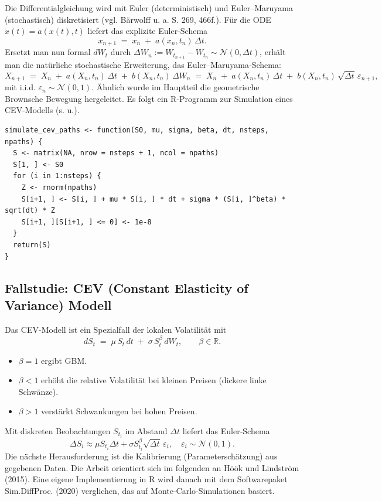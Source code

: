 Die Differentialgleichung wird mit Euler (deterministisch) und Euler–Maruyama (stochastisch) diskretisiert (vgl. Bärwolff \cite{Baerwolff2025} u. a. S. 269, 466f.).
Für die ODE $\dot x(t)=a(x(t),t)$ liefert das explizite Euler‑Schema
$$
x_{n+1} \;=\; x_n \;+\; a(x_n,t_n)\,\Delta t.
$$
Ersetzt man nun formal $dW_t$ durch $\Delta W_n:=W_{t_{n+1}}-W_{t_n}\sim \mathcal N(0,\Delta t)$, erhält man die natürliche stochastische Erweiterung, das Euler–Maruyama‑Schema:
$$
X_{n+1} \;=\; X_n \;+\; a(X_n,t_n)\,\Delta t \;+\; b(X_n,t_n)\,\Delta W_n
\;=\; X_n \;+\; a(X_n,t_n)\,\Delta t \;+\; b(X_n,t_n)\,\sqrt{\Delta t}\,\varepsilon_{n+1},
$$
mit i.i.d. $\varepsilon_{n}\sim\mathcal N(0,1)$. 
Ähnlich wurde im Hauptteil die geometrische Brownsche Bewegung hergeleitet.
Es folgt ein R-Programm zur Simulation eines CEV-Modells (s. u.).

\begin{lstlisting}
simulate_cev_paths <- function(S0, mu, sigma, beta, dt, nsteps, npaths) {
  S <- matrix(NA, nrow = nsteps + 1, ncol = npaths)
  S[1, ] <- S0
  for (i in 1:nsteps) {
    Z <- rnorm(npaths)
    S[i+1, ] <- S[i, ] + mu * S[i, ] * dt + sigma * (S[i, ]^beta) * sqrt(dt) * Z
    S[i+1, ][S[i+1, ] <= 0] <- 1e-8
  }
  return(S)
}
\end{lstlisting}

\subsection{Fallstudie: CEV (Constant Elasticity of Variance) Modell}
Das CEV-Modell ist ein Spezialfall der lokalen Volatilität mit
$$
dS_t \;=\; \mu\,S_t\,dt \;+\; \sigma\,S_t^{\beta}\,dW_t,\qquad \beta\in\mathbb R.
$$
\begin{itemize}
\item $\beta=1$ ergibt GBM. 
\item $\beta<1$ erhöht die relative Volatilität bei kleinen Preisen (dickere linke Schwänze).
\item $\beta>1$ verstärkt Schwankungen bei hohen Preisen.
\end{itemize}

Mit diskreten Beobachtungen $S_{t_i}$ im Abstand $\Delta t$ liefert das Euler‑Schema
$$
\Delta S_i \approx \mu S_{t_i}\Delta t + \sigma S_{t_i}^{\beta}\sqrt{\Delta t}\,\varepsilon_i,\quad \varepsilon_i\sim\mathcal N(0,1).
$$
Die nächste Herausforderung ist die Kalibrierung (Parameterschätzung) aus gegebenen Daten. Die Arbeit 
orientiert sich im folgenden an Höök und Lindström \cite{hook2015estimation} (2015). Eine eigene Implementierung in
R wird danach mit dem Softwarepaket Sim.DiffProc. \cite{iooss2006sde} (2020) verglichen, das auf Monte-Carlo-Simulationen basiert.

